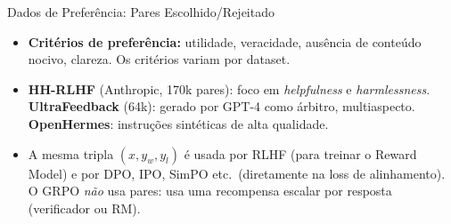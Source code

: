 \documentclass[aspectratio=169, xcolor=dvipsnames]{beamer}
\begin{document}
\begin{frame}{Dados de Preferência: Pares Escolhido/Rejeitado}
{\begin{itemize}
      \item \textbf{Critérios de preferência:} utilidade, veracidade, ausência de conteúdo nocivo, clareza. Os critérios variam por dataset.
      \item \textbf{HH-RLHF} (Anthropic, 170k pares): foco em \textit{helpfulness} e \textit{harmlessness}. \textbf{UltraFeedback} (64k): gerado por GPT-4 como árbitro, multiaspecto. \textbf{OpenHermes}: instruções sintéticas de alta qualidade.
      \item A mesma tripla $(x, y_w, y_l)$ é usada por RLHF (para treinar o Reward Model) e por DPO, IPO, SimPO etc.\ (diretamente na loss de alinhamento). O GRPO \emph{não} usa pares: usa uma recompensa escalar por resposta (verificador ou RM).
    \end{itemize}
  }
  \end{frame}
\end{document}
